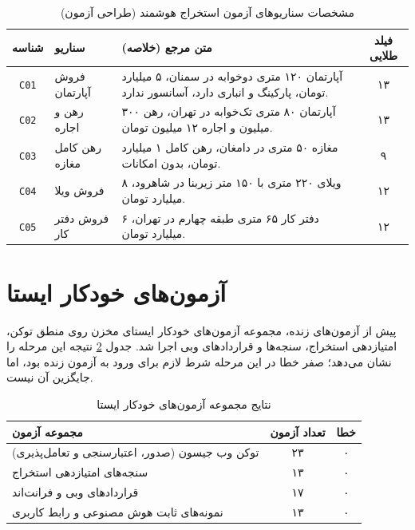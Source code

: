 \documentclass[11pt, a4paper]{report}
\newcommand{\code}[1]{\foreignlanguage{english}{\texttt{#1}}}
\begin{document}
\begin{table}[htbp]
\centering
\caption{مشخصات سناریوهای آزمون استخراج هوشمند (طراحی آزمون)}
\label{tab:scenario_design}
\renewcommand{\arraystretch}{1.5}
\begin{tabular}{|c|p{2.6cm}|p{6.6cm}|c|}
\hline
\textbf{شناسه} & \textbf{سناریو} & \textbf{متن مرجع (خلاصه)} & \textbf{فیلد طلایی} \\ \hline
\code{C01} & فروش آپارتمان & آپارتمان ۱۲۰ متری دوخوابه در سمنان، ۵ میلیارد تومان، پارکینگ و انباری دارد، آسانسور ندارد. & ۱۳ \\ \hline
\code{C02} & رهن و اجاره & آپارتمان ۸۰ متری تک‌خوابه در تهران، رهن ۳۰۰ میلیون و اجاره ۱۲ میلیون تومان. & ۱۳ \\ \hline
\code{C03} & رهن کامل مغازه & مغازه ۵۰ متری در دامغان، رهن کامل ۱ میلیارد تومان، بدون امکانات. & ۹ \\ \hline
\code{C04} & فروش ویلا & ویلای ۲۲۰ متری با ۱۵۰ متر زیربنا در شاهرود، ۸ میلیارد تومان. & ۱۲ \\ \hline
\code{C05} & فروش دفتر کار & دفتر کار ۶۵ متری طبقه چهارم در تهران، ۶ میلیارد تومان. & ۱۲ \\ \hline
\end{tabular}
\end{table}

\section{آزمون‌های خودکار ایستا}
پیش از آزمون‌های زنده، مجموعه آزمون‌های خودکار ایستای مخزن روی منطق توکن، امتیازدهی استخراج، سنجه‌ها و قراردادهای وبی اجرا شد. جدول \ref{tab:auto_tests} نتیجه این مرحله را نشان می‌دهد؛ صفر خطا در این مرحله شرط لازم برای ورود به آزمون زنده بود، اما جایگزین آن نیست.

\begin{table}[htbp]
\centering
\caption{نتایج مجموعه آزمون‌های خودکار ایستا}
\label{tab:auto_tests}
\renewcommand{\arraystretch}{1.5}
\begin{tabular}{|p{6cm}|c|c|}
\hline
\textbf{مجموعه آزمون} & \textbf{تعداد آزمون} & \textbf{خطا} \\ \hline
توکن وب جیسون (صدور، اعتبارسنجی و تعامل‌پذیری) & ۲۳ & ۰ \\ \hline
سنجه‌های امتیازدهی استخراج & ۱۳ & ۰ \\ \hline
قراردادهای وبی و فرانت‌اند & ۱۷ & ۰ \\ \hline
نمونه‌های ثابت هوش مصنوعی و رابط کاربری & ۱۳ & ۰ \\ \hline
\end{tabular}
\end{table}
\end{document}
